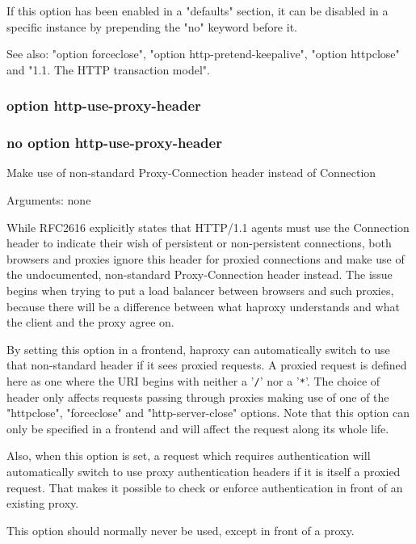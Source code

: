   If this option has been enabled in a "defaults" section, it can be disabled
  in a specific instance by prepending the "no" keyword before it.

  See also: "option forceclose", "option http-pretend-keepalive",
             "option httpclose" and "1.1. The HTTP transaction model".

\subsubsection{option http-use-proxy-header}
\subsubsection{no option http-use-proxy-header}


  Make use of non-standard Proxy-Connection header instead of Connection


  Arguments: none

  While RFC2616 explicitly states that HTTP/1.1 agents must use the
  Connection header to indicate their wish of persistent or non-persistent
  connections, both browsers and proxies ignore this header for proxied
  connections and make use of the undocumented, non-standard Proxy-Connection
  header instead. The issue begins when trying to put a load balancer between
  browsers and such proxies, because there will be a difference between what
  haproxy understands and what the client and the proxy agree on.

  By setting this option in a frontend, haproxy can automatically switch to use
  that non-standard header if it sees proxied requests. A proxied request is
  defined here as one where the URI begins with neither a '\verb|/|' nor a '\verb|*|'. The
  choice of header only affects requests passing through proxies making use of
  one of the "httpclose", "forceclose" and "http-server-close" options. Note
  that this option can only be specified in a frontend and will affect the
  request along its whole life.

  Also, when this option is set, a request which requires authentication will
  automatically switch to use proxy authentication headers if it is itself a
  proxied request. That makes it possible to check or enforce authentication in
  front of an existing proxy.

  This option should normally never be used, except in front of a proxy.

